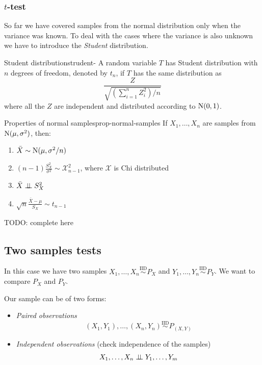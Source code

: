 \documentclass[12pt]{extarticle}
\newcommand{\Normal}{{\operatorfont N}}
\begin{document}
\subsubsection{\texorpdfstring{$t$}{t}-test}

So far we have covered samples from the normal distribution only when the variance was known.
To deal with the cases where the variance is also unknown we have to introduce the \emph{Student} distribution.

\begin{definition}{Student distribution}{strudent-}
    A random variable $T$ has Student distribution with $n$ degrees of freedom, denoted by $t_n$, if $T$ has the same distribution as
    \begin{equation}
        \frac{Z}{\sqrt{(\sum^n_{i=1} Z_i^2)/n}}
    \end{equation}
    where all the $Z$ are independent and distributed according to $\Normal(0,1)$.
\end{definition}

\begin{theorem}{Properties of normal samples}{prop-normal-samples}
    If $X_1, \dots, X_n$ are samples from $\Normal(\mu, \sigma^2)$, then:
    \begin{enumerate}[label=\roman*.]
        \item $\bar X \sim \Normal(\mu, \sigma^2/n)$
        \item $(n-1)\frac{S_X^2}{\sigma^2} \sim \mathcal X^2_{n-1}$, where $\mathcal X$ is Chi distributed
        \item $\bar X \perp \!\!\! \perp S_X^2$
        \item $\sqrt n \frac{\bar X - \mu}{S_X} \sim t_{n-1}$
    \end{enumerate}
\end{theorem}

TODO: complete here

\subsection{Two samples tests}

In this case we have two samples
$X_1, \dots, X_n \stackrel{\text{IID}}{\sim}P_X$ and
$Y_1, \dots, Y_n \stackrel{\text{IID}}{\sim}P_Y$.
We want to compare $P_X$ and $P_Y$.

Our sample can be of two forms:
\begin{itemize}
    \item \emph{Paired observations}
          \begin{equation}
              (X_1, Y_1), \dots, (X_n, Y_n) \stackrel{\text{IID}}{\sim} P_{(X, Y)}
          \end{equation}
    \item \emph{Independent observations} (check independence of the samples)
          \begin{equation}
              X_1, \dots, X_n \perp \!\!\! \perp Y_1, \dots, Y_m
          \end{equation}
\end{itemize}
\end{document}
